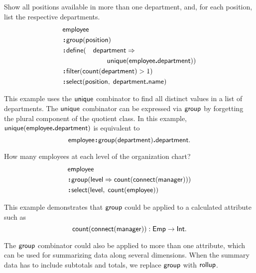 \begin{demo}
    \label{ex:unique-department}
    Show all positions available in more than one department, and, for each
    position, list the respective departments.
    \begin{alignat*}{2}
        & \Employee\hidewidth &&  \\
        & \Apply\Group(\Position)\hidewidth && \\
        & \Apply\Define(&& \Department\As \\
        & && \qquad \Unique(\Employee\To\Department)) \\
        & \Apply\Filter(\Count(\Department) > 1)\hidewidth && \\
        & \Apply\Select(\Position,\; \Department\To\Name)\hidewidth &&
    \end{alignat*}
\end{demo}

This example uses the $\mathsf{unique}$ combinator to find all distinct values in a
list of departments.  The $\mathsf{unique}$ combinator can be expressed via $\mathsf{group}$ by
forgetting the plural component of the quotient class.  In this example,
$\mathsf{unique}(\mathsf{employee}\boldsymbol{.}\allowbreak\mathsf{department})$ is equivalent to
\begin{equation*}
    \mathsf{employee}\!\boldsymbol{:}\!\mathsf{group}(\mathsf{department})\boldsymbol{.}\mathsf{department}.
\end{equation*}

\begin{demo}
    \label{ex:employee-group-level}
    How many employees at each level of the organization chart?
    \begin{align*}
        & \mathsf{employee} \\
        & \!\boldsymbol{:}\!\mathsf{group}(\mathsf{level}\Rightarrow\mathsf{count}(\mathsf{connect}(\mathsf{manager}))) \\
        & \!\boldsymbol{:}\!\mathsf{select}(\mathsf{level},\; \mathsf{count}(\mathsf{employee}))
    \end{align*}
\end{demo}

This example demonstrates that $\mathsf{group}$ could be applied to a calculated
attribute such as
\begin{equation*}
    \mathsf{count}(\mathsf{connect}(\mathsf{manager})) : \mathsf{Emp} \to \mathsf{Int}.
\end{equation*}

The $\mathsf{group}$ combinator could also be applied to more than one attribute, which
can be used for summarizing data along several dimensions.  When the summary
data has to include subtotals and totals, we replace $\mathsf{group}$ with $\mathsf{rollup}$.

